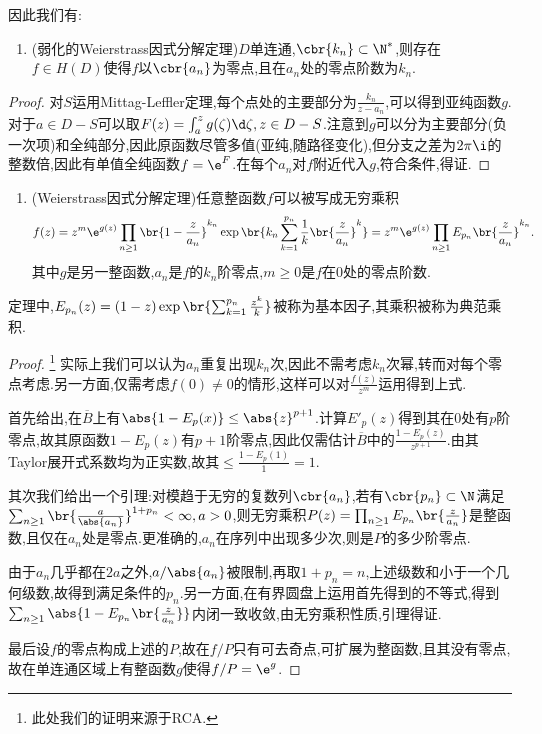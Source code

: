 \documentclass{article}
\begin{document}
因此我们有:
\begin{enumerate}[resume]
    \item (弱化的Weierstrass因式分解定理)$D$单连通,$\cbr{k_n}\subset\N^*$,则存在$f\in H(D)$使得$f$以$\cbr{a_n}$为零点,且在$a_n$处的零点阶数为$k_n$.
\end{enumerate}
\begin{proof}
    对$S$运用Mittag-Leffler定理,每个点处的主要部分为$\frac{k_n}{z-a_n}$,可以得到亚纯函数$g$.对于$a\in D-S$可以取$F(z)=\int_a^z g(\zeta)\d\zeta,z\in D-S$.注意到$g$可以分为主要部分(负一次项)和全纯部分,因此原函数尽管多值(亚纯,随路径变化),但分支之差为$2\pi\i$的整数倍,因此有单值全纯函数$f=\e^F$.在每个$a_n$对$f$附近代入$g$,符合条件,得证.
\end{proof}

\begin{enumerate}[resume]
    \item (Weierstrass因式分解定理)任意整函数$f$可以被写成无穷乘积
    $$f(z)=z^m\e^{g(z)}\prod_{n\geq 1}\br{1-\frac{z}{a_n}}^{k_n}\exp\br{k_n\sum_{k=1}^{p_n} \frac{1}{k}\br{\frac{z}{a_n}}^k}=z^m\e^{g(z)}\prod_{n\geq 1}E_{p_n}\br{\frac{z}{a_n}}^{k_n}.$$
    其中$g$是另一整函数,$a_n$是$f$的$k_n$阶零点,$m\geq 0$是$f$在0处的零点阶数.
\end{enumerate}
定理中,$E_{p_n}(z)=(1-z)\exp\br{\sum_{k=1}^{p_n}\frac{z^k}{k}}$被称为基本因子,其乘积被称为典范乘积.
\begin{proof}\footnote{此处我们的证明来源于RCA.}
    实际上我们可以认为$a_n$重复出现$k_n$次,因此不需考虑$k_n$次幂,转而对每个零点考虑.另一方面,仅需考虑$f(0)\neq 0$的情形,这样可以对$\frac{f(z)}{z^m}$运用得到上式.

    首先给出,在$\overline{B}$上有$\abs{1-E_p(x)}\leq\abs{z}^{p+1}$.计算$E'_p(z)$得到其在0处有$p$阶零点,故其原函数$1-E_p(z)$有$p+1$阶零点,因此仅需估计$\overline{B}$中的$\frac{1-E_p(z)}{z^{p+1}}$.由其Taylor展开式系数均为正实数,故其$\leq \frac{1-E_p(1)}{1}=1$.

    其次我们给出一个引理:对模趋于无穷的复数列$\cbr{a_n}$,若有$\cbr{p_n}\subset\N$满足$\sum_{n\geq 1}\br{\frac{a}{\abs{a_n}}}^{1+p_n}<\infty,a>0$,则无穷乘积$P(z)=\prod_{n\geq 1}E_{p_n}\br{\frac{z}{a_n}}$是整函数,且仅在$a_n$处是零点.更准确的,$a_n$在序列中出现多少次,则是$P$的多少阶零点.

    由于$a_n$几乎都在$2a$之外,$a/\abs{a_n}$被限制,再取$1+p_n=n$,上述级数和小于一个几何级数,故得到满足条件的$p_n$.另一方面,在有界圆盘上运用首先得到的不等式,得到$\sum_{n\geq 1}\abs{1-E_{p_n}\br{\frac{z}{a_n}}}$内闭一致收敛,由无穷乘积性质,引理得证.

    最后设$f$的零点构成上述的$P$,故在$f/P$只有可去奇点,可扩展为整函数,且其没有零点,故在单连通区域上有整函数$g$使得$f/P=\e^g$.
\end{proof}
\end{document}
